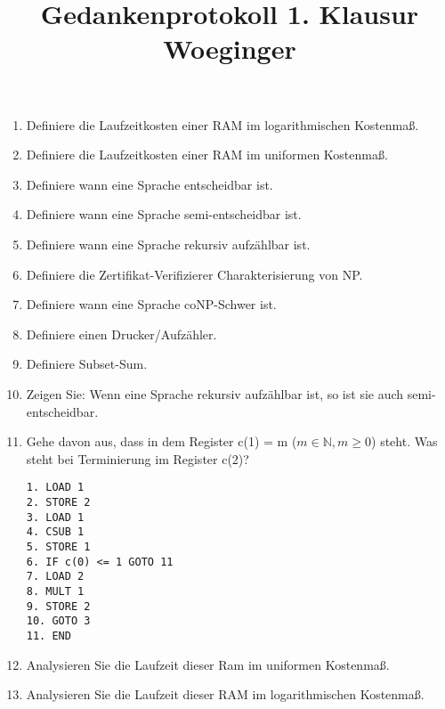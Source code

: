 \documentclass[11pt]{article}
\begin{document}
\author{}
\title{Gedankenprotokoll 1. Klausur Woeginger}
\maketitle

\medskip

\begin{enumerate}

\item
Definiere die Laufzeitkosten einer RAM im logarithmischen Kostenmaß.

\item
Definiere die Laufzeitkosten einer RAM im uniformen Kostenmaß.

\item
Definiere wann eine Sprache entscheidbar ist.

\item
Definiere wann eine Sprache semi-entscheidbar ist.

\item
Definiere wann eine Sprache rekursiv aufzählbar ist.

\item
Definiere die Zertifikat-Verifizierer Charakterisierung von NP.

\item
Definiere wann eine Sprache coNP-Schwer ist.

\item
Definiere einen Drucker/Aufzähler.

\item
Definiere Subset-Sum.

\item
Zeigen Sie: Wenn eine Sprache rekursiv aufzählbar ist, so ist sie auch semi-entscheidbar.

\item Gehe davon aus, dass in dem Register c(1) = m ($m \in \mathbb{N}, m \geq 0$) steht. Was steht bei Terminierung im Register c(2)?
\begin{lstlisting}
1. LOAD 1
2. STORE 2
3. LOAD 1
4. CSUB 1
5. STORE 1
6. IF c(0) <= 1 GOTO 11
7. LOAD 2
8. MULT 1
9. STORE 2
10. GOTO 3
11. END
\end{lstlisting}

\item
Analysieren Sie die Laufzeit dieser Ram im uniformen Kostenmaß.

\item
Analysieren Sie die Laufzeit dieser RAM im logarithmischen Kostenmaß.


\end{enumerate}
\end{document}
